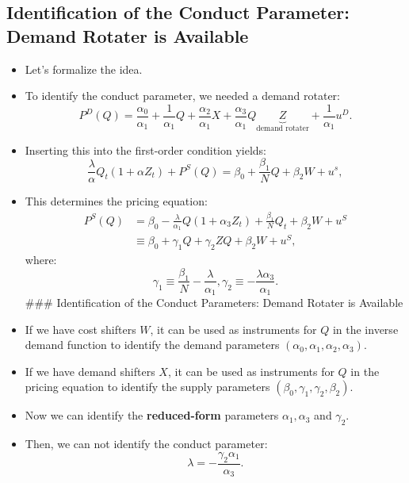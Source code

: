 \documentclass[
]{book}
\begin{document}
\hypertarget{identification-of-the-conduct-parameter-demand-rotater-is-available}{%
\subsection{Identification of the Conduct Parameter: Demand Rotater is Available}\label{identification-of-the-conduct-parameter-demand-rotater-is-available}}

\begin{itemize}
\item
  Let's formalize the idea.
\item
  To identify the conduct parameter, we needed a demand rotater:
  \begin{equation}
  P^D(Q) = \frac{\alpha_0}{\alpha_1} + \frac{1}{\alpha_1}Q + \frac{\alpha_2}{\alpha_1} X + \frac{\alpha_3}{\alpha_1} Q \underbrace{Z}_{\text{demand rotater}} +  \frac{1}{\alpha_1}u^D.
  \end{equation}
\item
  Inserting this into the first-order condition yields:
  \begin{equation}
  \frac{\lambda}{\alpha} Q_t (1 + \alpha Z_t)+ P^S(Q) = \beta_0 + \frac{\beta_1}{N} Q + \beta_2 W + u^s,
  \end{equation}
\item
  This determines the pricing equation:
  \begin{equation}
  \begin{split}
  P^S(Q) &= \beta_0 - \frac{\lambda}{\alpha_1} Q(1 + \alpha_3 Z_t) + \frac{\beta_1}{N} Q_t + \beta_2 W + u^S\\
  &\equiv \beta_0 + \gamma_1 Q + \gamma_2 Z Q + \beta_2 W + u^S,
  \end{split}
  \end{equation}
  where:
  \begin{equation}
  \gamma_1 \equiv \frac{\beta_1}{N} - \frac{\lambda}{\alpha_1}, \gamma_2 \equiv - \frac{\lambda \alpha_3}{\alpha_1}.
  \end{equation}
  \#\#\# Identification of the Conduct Parameters: Demand Rotater is Available
\item
  If we have cost shifters \(W\), it can be used as instruments for \(Q\) in the inverse demand function to identify the demand parameters \((\alpha_0, \alpha_1, \alpha_2, \alpha_3)\).
\item
  If we have demand shifters \(X\), it can be used as instruments for \(Q\) in the pricing equation to identify the supply parameters \((\beta_0, \gamma_1, \gamma_2, \beta_2)\).
\item
  Now we can identify the \textbf{reduced-form} parameters \(\alpha_1, \alpha_3\) and \(\gamma_2\).
\item
  Then, we can not identify the conduct parameter:
  \begin{equation}
  \lambda = - \frac{\gamma_2 \alpha_1}{\alpha_3}.
  \end{equation}
\end{itemize}
\end{document}
